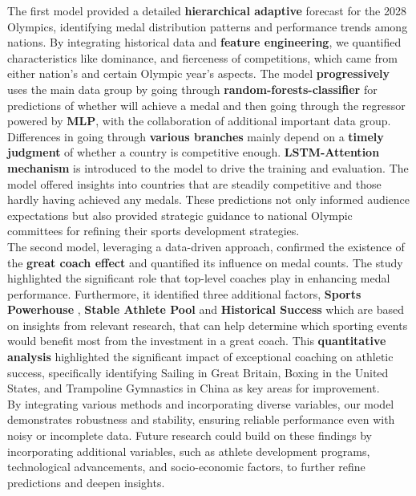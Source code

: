 \documentclass[12pt]{article}
\begin{document}
The first model provided a detailed \textbf{hierarchical adaptive} forecast for the 2028 Olympics, identifying medal distribution patterns and performance trends among nations. By integrating historical data and \textbf{feature engineering}, we quantified characteristics like dominance, and fierceness of competitions, which came from either nation's and certain Olympic year's aspects. The model \textbf{progressively} uses the main data group by going through \textbf{random-forests-classifier} for predictions of whether will achieve a medal and then going through the regressor powered by \textbf{MLP}, with the collaboration of additional important data group. Differences in going through \textbf{various branches} mainly depend on a \textbf{timely judgment} of whether a country is competitive enough. \textbf{LSTM-Attention mechanism} is introduced to the model to drive the training and evaluation. The model offered insights into countries that are steadily competitive and those hardly having achieved any medals. These predictions not only informed audience expectations but also provided strategic guidance to national Olympic committees for refining their sports development strategies.\\

The second model, leveraging a data-driven approach, confirmed the existence of the \textbf{great coach effect} and quantified its influence on medal counts. The study highlighted the significant role that top-level coaches play in enhancing medal performance. Furthermore, it identified three additional factors, \textbf{Sports Powerhouse} , \textbf{Stable Athlete Pool} and \textbf{Historical Success} which are based on insights from relevant research, that can help determine which sporting events would benefit most from the investment in a great coach. This \textbf{quantitative analysis} highlighted the significant impact of exceptional coaching on athletic success, specifically identifying Sailing in Great Britain, Boxing in the United States, and Trampoline Gymnastics in China as key areas for improvement. \\

By integrating various methods and incorporating diverse variables, our model demonstrates robustness and stability, ensuring reliable performance even with noisy or incomplete data. Future research could build on these findings by incorporating additional variables, such as athlete development programs, technological advancements, and socio-economic factors, to further refine predictions and deepen insights. \\
\end{document}
